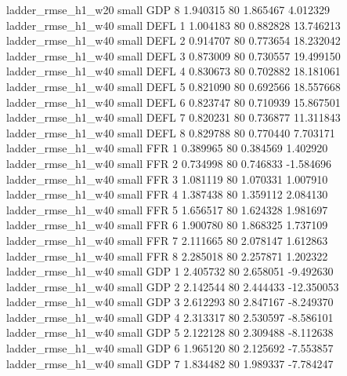       ladder_rmse_h1_w20      small      GDP                 8 1.940315 80       1.865467           4.012329
      ladder_rmse_h1_w40      small     DEFL                 1 1.004183 80       0.882828          13.746213
      ladder_rmse_h1_w40      small     DEFL                 2 0.914707 80       0.773654          18.232042
      ladder_rmse_h1_w40      small     DEFL                 3 0.873009 80       0.730557          19.499150
      ladder_rmse_h1_w40      small     DEFL                 4 0.830673 80       0.702882          18.181061
      ladder_rmse_h1_w40      small     DEFL                 5 0.821090 80       0.692566          18.557668
      ladder_rmse_h1_w40      small     DEFL                 6 0.823747 80       0.710939          15.867501
      ladder_rmse_h1_w40      small     DEFL                 7 0.820231 80       0.736877          11.311843
      ladder_rmse_h1_w40      small     DEFL                 8 0.829788 80       0.770440           7.703171
      ladder_rmse_h1_w40      small      FFR                 1 0.389965 80       0.384569           1.402920
      ladder_rmse_h1_w40      small      FFR                 2 0.734998 80       0.746833          -1.584696
      ladder_rmse_h1_w40      small      FFR                 3 1.081119 80       1.070331           1.007910
      ladder_rmse_h1_w40      small      FFR                 4 1.387438 80       1.359112           2.084130
      ladder_rmse_h1_w40      small      FFR                 5 1.656517 80       1.624328           1.981697
      ladder_rmse_h1_w40      small      FFR                 6 1.900780 80       1.868325           1.737109
      ladder_rmse_h1_w40      small      FFR                 7 2.111665 80       2.078147           1.612863
      ladder_rmse_h1_w40      small      FFR                 8 2.285018 80       2.257871           1.202322
      ladder_rmse_h1_w40      small      GDP                 1 2.405732 80       2.658051          -9.492630
      ladder_rmse_h1_w40      small      GDP                 2 2.142544 80       2.444433         -12.350053
      ladder_rmse_h1_w40      small      GDP                 3 2.612293 80       2.847167          -8.249370
      ladder_rmse_h1_w40      small      GDP                 4 2.313317 80       2.530597          -8.586101
      ladder_rmse_h1_w40      small      GDP                 5 2.122128 80       2.309488          -8.112638
      ladder_rmse_h1_w40      small      GDP                 6 1.965120 80       2.125692          -7.553857
      ladder_rmse_h1_w40      small      GDP                 7 1.834482 80       1.989337          -7.784247
